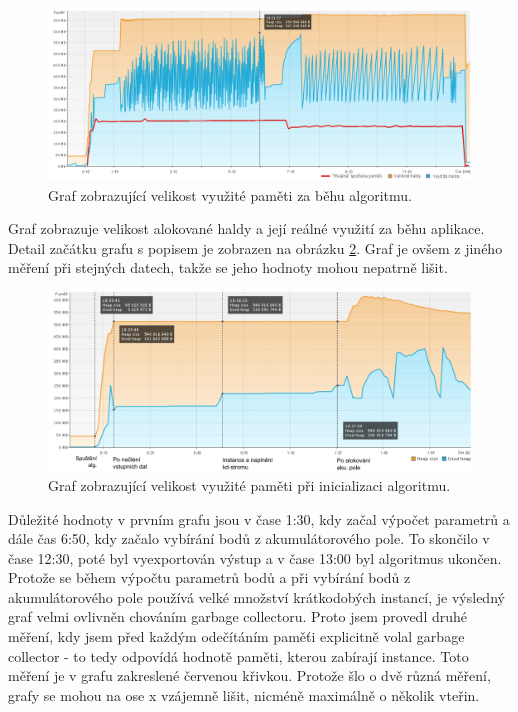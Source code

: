 \documentclass[11pt,twoside,a4paper]{book}
\begin{document}
\begin{figure}[t!]
\begin{center}
\includegraphics[width=\textwidth]{figures/memory-graph-all}
\caption{Graf zobrazující velikost využité paměti za běhu algoritmu.}
\label{fig:memory-graph-all}
\end{center}
\end{figure}

Graf zobrazuje velikost alokované haldy a její reálné využití za běhu aplikace. Detail začátku grafu s popisem je zobrazen na obrázku \ref{fig:memory-graf1}. Graf je ovšem z jiného měření při stejných datech, takže se jeho hodnoty mohou nepatrně lišit. 

\begin{figure}[ht]
\begin{center}
\includegraphics[width=\textwidth]{figures/memory-graf1}
\caption{Graf zobrazující velikost využité paměti při inicializaci algoritmu.}
\label{fig:memory-graf1}
\end{center}
\end{figure}

Důležité hodnoty v prvním grafu jsou v čase 1:30, kdy začal výpočet parametrů a dále čas 6:50, kdy začalo vybírání bodů z akumulátorového pole. To skončilo v čase 12:30, poté byl vyexportován výstup a v čase 13:00 byl algoritmus ukončen. Protože se během výpočtu parametrů bodů a při vybírání bodů z akumulátorového pole používá velké množství krátkodobých instancí, je výsledný graf velmi ovlivněn chováním garbage collectoru. Proto jsem provedl druhé měření, kdy jsem před každým odečítáním paměťi explicitně volal garbage collector - to tedy odpovídá hodnotě paměti, kterou zabírají  instance. Toto měření je v grafu zakreslené červenou křivkou. Protože šlo o dvě různá měření, grafy se mohou na ose x vzájemně lišit, nicméně maximálně o několik vteřin.
\end{document}
